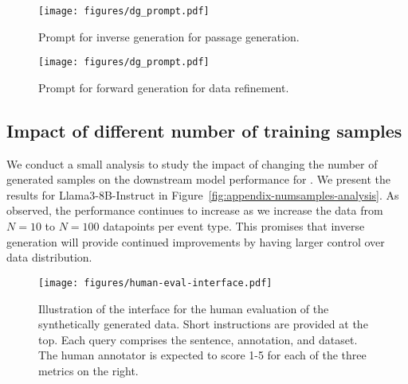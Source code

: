 \begin{figure}[t]
    \centering
    \texttt{[image: figures/dg\_prompt.pdf]}
    \caption{Prompt for inverse generation for passage generation.}
    \label{fig:dg_prompt}
\end{figure}

\begin{figure}[t]
    \centering
    \texttt{[image: figures/dg\_prompt.pdf]}
    \caption{Prompt for forward generation for data refinement.}
    \label{fig:dv_prompt}
\end{figure}

\subsection{Impact of different number of training samples}
\label{sec:appendix-num-samples-analysis}

We conduct a small analysis to study the impact of changing the number of generated samples on the downstream model performance for \modelName.
We present the results for Llama3-8B-Instruct in Figure~\ref{fig:appendix-numsamples-analysis}.
As observed, the performance continues to increase as we increase the data from $N=10$ to $N=100$ datapoints per event type.
This promises that inverse generation will provide continued improvements by having larger control over data distribution.

\begin{figure*}
    \centering
    \texttt{[image: figures/human-eval-interface.pdf]}
    \caption{Illustration of the interface for the human evaluation of the synthetically generated data. Short instructions are provided at the top. Each query comprises the sentence, annotation, and dataset. The human annotator is expected to score 1-5 for each of the three metrics on the right.}
    \label{fig:human-annotation-interface}
\end{figure*}

